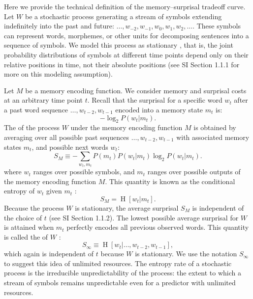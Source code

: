 Here we provide the technical definition of the memory--surprisal tradeoff curve.
Let $W$ be a stochastic process generating a stream of symbols extending indefinitely into the past and future: $\dots, w_{-2}, w_{-1}, w_0, w_{1}, w_{2}, \dots$. %
These symbols can represent words, morphemes, or other units for decomposing sentences into a sequence of symbols. 
We model this process as stationary \citep{doob1953stochastic}, that is, the joint probability distributions of symbols at different time points depend only on their relative positions in time, not their absolute positions (see SI Section 1.1.1 for more on this modeling assumption).

Let $M$ be a memory encoding function.
We consider memory and surprisal costs at an arbitrary time point $t$.
Recall that the surprisal for a specific word $w_t$ after a past word sequence $\dots, w_{t-2}, w_{t-1}$ encoded into a memory state $m_t$ is:
\begin{equation*}
    -\log_2 P(w_t | m_t).
\end{equation*}
The  of the process $W$ under the memory encoding function $M$ is obtained by averaging over all possible past sequences $\dots, w_{t-2}, w_{t-1}$ with associated memory states $m_t$, and possible next words $w_t$:
\begin{equation*}
   S_M \equiv -\sum_{w_t,m_t}  P(m_t) P(w_t|m_t) \log_2 P(w_t | m_t).
\end{equation*}
where $w_t$ ranges over possible symbols, and $m_t$ ranges over possible outputs of the memory encoding function $M$.
This quantity is known as the conditional entropy of $w_t$ given $m_t$ \citep[][p. 17]{cover2006elements}:
\begin{equation*}
	S_M = \operatorname{H}[w_t | m_t].
\end{equation*}
Because the process $W$ is stationary, the average surprisal $S_M$ is independent of the choice of $t$ (see SI Section 1.1.2).
The lowest possible average surprisal for $W$ is attained when $m_t$ perfectly encodes all previous observed words.
This quantity is called the  of $W$ \citep[][pp. 74--75]{cover2006elements}:
\begin{equation*}
	S_\infty \equiv \operatorname{H}[w_t | \dots, w_{t-2}, w_{t-1}],
\end{equation*}
which again is independent of $t$ because $W$ is stationary.
We use the notation $S_\infty$ to suggest this idea of unlimited resources.
 The entropy rate of a stochastic process is the irreducible unpredictability of the process: the extent to which a stream of symbols remains unpredictable even for a predictor with unlimited resources. 

